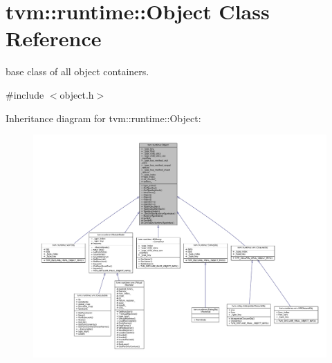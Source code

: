 \hypertarget{classtvm_1_1runtime_1_1Object}{}\section{tvm\+:\+:runtime\+:\+:Object Class Reference}
\label{classtvm_1_1runtime_1_1Object}


base class of all object containers.  




{\ttfamily \#include $<$object.\+h$>$}



Inheritance diagram for tvm\+:\+:runtime\+:\+:Object\+:
\nopagebreak
\begin{figure}[H]
\begin{center}
\leavevmode
\includegraphics[width=350pt]{classtvm_1_1runtime_1_1Object__inherit__graph}
\end{center}
\end{figure}


